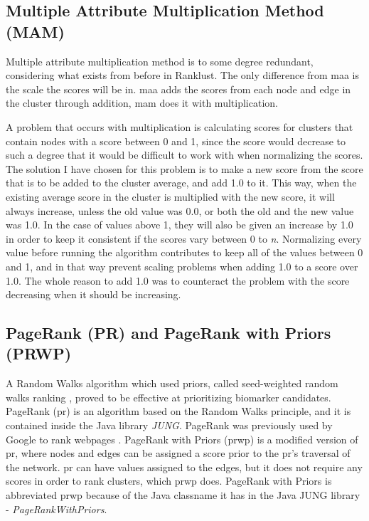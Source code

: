\subsection{Multiple Attribute Multiplication Method (MAM)} Multiple attribute
multiplication method is to some degree redundant, considering what exists from
before in Ranklust. The only difference from \gls{maa} is the scale the scores
will be in. \gls{maa} adds the scores from each node and edge in the cluster
through addition, \gls{mam} does it with multiplication.

A problem that occurs with multiplication is calculating scores for clusters
that contain nodes with a score between 0 and 1, since the score would decrease
to such a degree that it would be difficult to work with when normalizing the
scores. The solution I have chosen for this problem is to make a new score from
the score that is to be added to the cluster average, and add 1.0 to it. This
way, when the existing average score in the cluster is multiplied with the new
score, it will always increase, unless the old value was 0.0, or both the old
and the new value was 1.0. In the case of values above 1, they will also be
given an increase by 1.0 in order to keep it consistent if the scores vary
between 0 to \textit{n}. Normalizing every value before running the algorithm
contributes to keep all of the values between 0 and 1, and in that way prevent
scaling problems when adding 1.0 to a score over 1.0. The whole reason to add
1.0 was to counteract the problem with the score decreasing when it should be
increasing.

\subsection{PageRank (PR) and PageRank with Priors (PRWP)} 
A Random Walks\cite{random-walks2} algorithm which used priors, called
seed-weighted random walks ranking \cite{sw-rwr}, proved to be effective at
prioritizing biomarker candidates. PageRank (\gls{pr}) is an algorithm based on
the Random Walks principle, and it is contained inside the Java library
\textit{JUNG}\cite{jung}. PageRank was previously used by Google to rank
webpages \cite{pagerank}. PageRank with Priors (\gls{prwp})\cite{pr-bio} is a
modified version of \gls{pr}, where nodes and edges can be assigned a score
prior to the \gls{pr}'s traversal of the network. \gls{pr} can have values
assigned to the edges, but it does not require any scores in order to rank
clusters, which \gls{prwp} does. PageRank with Priors is abbreviated \gls{prwp}
because of the Java classname it has in the Java JUNG library
- \textit{PageRankWithPriors}.


